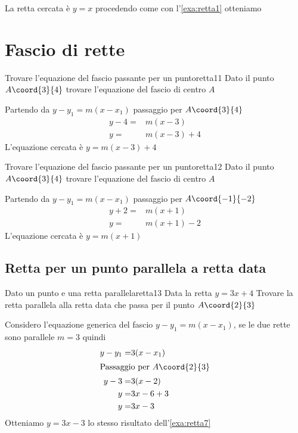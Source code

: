 La retta cercata è $y=x$ procedendo come con l'\cref{exa:retta1}
otteniamo
\begin{center}
	
	\label{fig:disegnoretta10}
\end{center}
\section{Fascio di rette}
\begin{esempiot}{Trovare l'equazione del fascio passante per un punto}{retta11}
	Dato il punto	$A\coord{3}{4}$ trovare l'equazione del fascio di centro $A$
\end{esempiot}
Partendo da $y-y_1=m(x-x_1)$ passaggio per 	$A\coord{3}{4}$
\begin{align*}
	y-4=&m(x-3)\\
	y=&m(x-3)+4
\end{align*}
L'equazione cercata è $y=m(x-3)+4$
\begin{esempiot}{Trovare l'equazione del fascio passante per un punto}{retta12}
	Dato il punto	$A\coord{3}{4}$ trovare l'equazione del fascio di centro $A$
\end{esempiot}
Partendo da $y-y_1=m(x-x_1)$ passaggio per 	$A\coord{-1}{-2}$
\begin{align*}
	y+2=&m(x+1)\\
	y=&m(x+1)-2
\end{align*}
L'equazione cercata è $y=m(x+1)$
\subsection{Retta per un punto parallela a retta data}
\begin{esempiot}{Dato un punto e una retta parallela}{retta13}
	Data la retta $y=3x+4$ Trovare la retta parallela alla retta data che  passa per il punto	$A\coord{2}{3}$
\end{esempiot}
Considero l'equazione generica del fascio $y-y_1=m(x-x_1)$, se le due rette sono parallele $m=3$ quindi
\begin{align*}
	y-y_1=&3(x-x_1)\\
	\intertext{Passaggio per $A\coord{2}{3}$}
	y-3=&3(x-2)\\
	y=&3x-6+3\\
	y=&3x-3\\
\end{align*}
Otteniamo 	$y=3x-3$ lo stesso risultato dell'\cref{exa:retta7}
